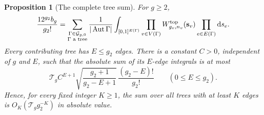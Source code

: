 \documentclass[a4paper,10pt]{article}
\numberwithin{equation}{section}
\newcommand{\dd}{\mathrm{d}}
\theoremstyle{paperplain}
\newtheorem{prp}[thm]{Proposition}
\theoremstyle{paperremark}
\theoremstyle{paperplain}
\begin{document}
\begin{prp}[The complete tree sum]\label{prp:s06:tree-tail}
For $g\geq2$,
\begin{equation}\label{eq:s06:tree-expansion}
 \frac{12^{g_2}b_g}{g_2!}
 =\sum_{\substack{\Gamma\in\mathcal G_{g,0}\\\Gamma\text{ a tree}}}
  \frac1{|\operatorname{Aut}\Gamma|}
  \int_{[0,1]^{E(\Gamma)}}
       \prod_{v\in V(\Gamma)}W^{\rm top}_{g_v,n_v}(\mathbf s_v)
       \prod_{e\in E(\Gamma)}\dd s_e.
\end{equation}
Every contributing tree has $E\leq g_2$ edges. There is a constant
$C>0$, independent of $g$ and $E$, such that the absolute sum of
its $E$-edge integrals is at most
\begin{equation}\label{eq:s06:edge-mass}
 \mathcal T_g C^{E+1}
 \sqrt{\frac{g_2+1}{g_2-E+1}}\,
                  \frac{(g_2-E)!}{g_2!}
 \qquad(0\leq E\leq g_2).
\end{equation}
Hence, for every fixed integer $K\geq1$, the sum over all trees
with at least $K$ edges is $O_K(\mathcal T_g g_2^{-K})$ in
absolute value.
\end{prp}
\end{document}
